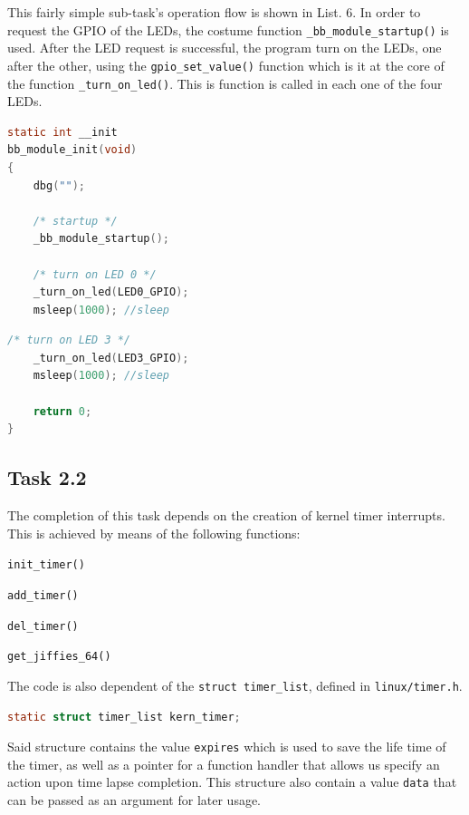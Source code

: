 \documentclass[letterpaper,12pt] {article}
\begin{document}
This fairly simple sub-task's operation flow is shown in List. 6. In order to request the GPIO of the LEDs, the costume function  \texttt{\_bb\_module\_startup()} is used. After the LED request is successful, the program turn on the LEDs, one after the other, using the \texttt{gpio\_set\_value()} function which is it at the core of the function \texttt{\_turn\_on\_led()}. This is function is called in each one of the four LEDs.\\

\begin{lstlisting}[firstnumber = 126 ,language=C   ]
static int __init
bb_module_init(void)
{	
	dbg("");
	
	/* startup */
	_bb_module_startup();
	
	/* turn on LED 0 */
	_turn_on_led(LED0_GPIO);
	msleep(1000); //sleep
\end{lstlisting}
\begin{lstlisting}[firstnumber = 146 ,language=C , caption =  Turn on LEDs in sequence  ]	
	/* turn on LED 3 */
	_turn_on_led(LED3_GPIO);
	msleep(1000); //sleep
	
	return 0;
}
\end{lstlisting}


\subsection*{Task 2.2}

The completion of this task depends on the creation of kernel timer interrupts. This is achieved by means of the following functions:

\begin{list}{}{}
	\item \texttt{init\_timer()}
	\item \texttt{add\_timer()}
	\item \texttt{del\_timer()}
	\item \texttt{get\_jiffies\_64()}
\end{list} 

The code is also dependent of the \texttt{struct timer\_list}, defined in \texttt{linux/timer.h}.\\
\begin{lstlisting}[firstnumber = 61 ,language=C    ]
static struct timer_list kern_timer;
\end{lstlisting}

Said structure contains the value \texttt{expires} which is used to save the life time of the timer, as well as a pointer for a function handler that allows us specify an action upon time lapse completion. This structure also contain a value \texttt{data} that can be passed as an argument for later usage. \\
\end{document}
